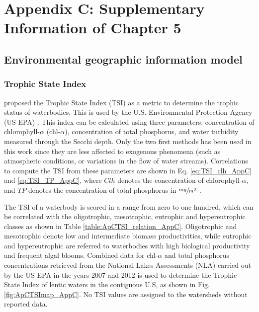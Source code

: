 \chapter{Appendix C: Supplementary Information of Chapter 5}

\begin{refsection}[referencesCh4]
\section{Environmental geographic information model} \label{section:Section1AppC}
\subsection{Trophic State Index} \label{section:TSIAppC}
\citet{carlson_trophic_1977} proposed the Trophic State Index (TSI) as a metric to determine the trophic status of waterbodies. This is used by the U.S. Environmental Protection Agency (US EPA) \citep{QAPP2012}. This index can be calculated using three parameters: concentration of chlorophyll-$\alpha$ (chl-$\alpha$), concentration of total phosphorus, and water turbidity measured through the Secchi depth. Only the two first methods has been used in this work since they are less affected to exogenous phenomena (such as atmospheric conditions, or variations in the flow of water streams). Correlations to compute the TSI from these parameters are shown in Eq. \ref{eq:TSI_clh_AppC} and \ref{eq:TSI_TP_AppC}, where $Clh$ denotes the concentration of chlorophyll-$\alpha$, and $TP$ denotes the concentration of total phosphorus in $\sfrac{mg}{m^3}$ \citep{carlson_trophic_1977}. 

The TSI of a waterbody is scored in a range from zero to one hundred, which can be correlated with the oligotrophic, mesotrophic, eutrophic and hypereutrophic classes as shown in Table \ref{table:ApCTSI_relation_AppC}. Oligotrophic and mesotrophic denote low and intermediate biomass productivities, while eutrophic and hypereutrophic are referred to waterbodies with high biological productivity and frequent algal blooms. Combined data for chl-$\alpha$ and total phosphorus concentrations retrieved from the National Lakes Assessments (NLA) carried out by the US EPA in the years 2007 and 2012 \citep{NLA2012, NLA2007} is used to determine the Trophic State Index of lentic waters in the contiguous U.S, as shown in Fig. \ref{fig:ApCTSImap_AppC}. No TSI values are assigned to the watersheds without reported data.


\end{refsection}
